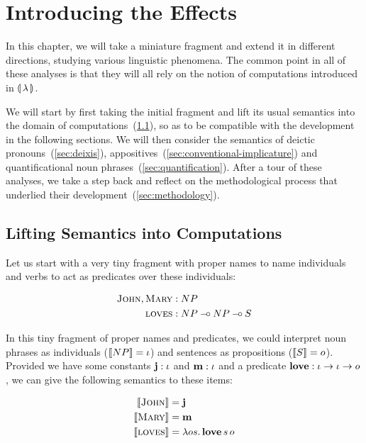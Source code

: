 \chapter{Introducing the Effects}
\label{chap:introducing-effects}

\setcounter{exx}{0}

In this chapter, we will take a miniature fragment and extend it in
different directions, studying various linguistic phenomena. The common
point in all of these analyses is that they will all rely on the notion of
computations introduced in $\llparenthesis \, \lambda \, \rrparenthesis$.

We will start by first taking the initial fragment and lift its usual
semantics into the domain of computations~(\ref{sec:lifting-semantics}), so
as to be compatible with the development in the following sections. We will
then consider the semantics of deictic pronouns~(\ref{sec:deixis}),
appositives~(\ref{sec:conventional-implicature}) and quantificational noun
phrases~(\ref{sec:quantification}). After a tour of these analyses, we take
a step back and reflect on the methodological process that underlied their
development~(\ref{sec:methodology}).

\minitoc


\section{Lifting Semantics into Computations}
\label{sec:lifting-semantics}

Let us start with a very tiny fragment with proper names to name
individuals and verbs to act as predicates over these individuals:

\begin{align*}
  \textsc{John}, \textsc{Mary} &: NP \\
  \textsc{loves} &: NP \mathbin{{-}\mkern-3.5mu{\circ}} NP \mathbin{{-}\mkern-3.5mu{\circ}} S
\end{align*}

In this tiny fragment of proper names and predicates, we could interpret
noun phrases as individuals ($\llbracket NP \rrbracket = \iota$) and sentences as
propositions ($\llbracket S \rrbracket = o$). Provided we have some constants
$\textbf{j} : \iota$ and $\textbf{m} : \iota$ and a predicate
$\textbf{love} : \iota \to \iota \to o$, we can give the following semantics
to these items:

\begin{align*}
  \llbracket \textsc{John} \rrbracket &= \textbf{j} \\
  \llbracket \textsc{Mary} \rrbracket &= \textbf{m} \\
  \llbracket \textsc{loves} \rrbracket &= \lambda o s.\, \textbf{love}\,s\,o
\end{align*}

